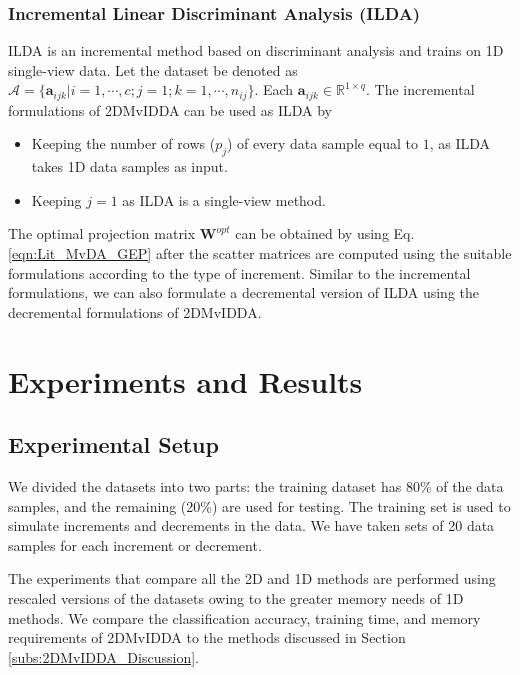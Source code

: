\subsubsection{Incremental Linear Discriminant Analysis (ILDA)}
\label{ssubs:2DMvIDDA_ILDA}
ILDA is an incremental method based on discriminant analysis and trains on 1D single-view data. Let the dataset be denoted as $\mathcal{A} = \{ \textbf{a}_{ijk} | i=1,\cdots,c; j=1; k=1,\cdots,n_{ij} \}$. Each $\textbf{a}_{ijk} \in \mathbb{R}^{1 \times q}$. The incremental formulations of 2DMvIDDA can be used as ILDA by 
\begin{itemize}
	\item Keeping the number of rows ($p_j$) of every data sample equal to $1$, as ILDA takes 1D data samples as input.
	\item Keeping $j = 1$ as ILDA is a single-view method.
\end{itemize}
The optimal projection matrix $\textbf{W}^{opt}$ can be obtained by using Eq. \ref{eqn:Lit_MvDA_GEP} after the scatter matrices are computed using the suitable formulations according to the type of increment. Similar to the incremental formulations, we can also formulate a decremental version of ILDA using the decremental formulations of 2DMvIDDA.












\section{Experiments and Results}
\label{sec:2DMvIDDA_Expt}

\subsection{Experimental Setup}
\label{subs:2DMvIDDA_Expt_Setup}
We divided the datasets into two parts: the training dataset has 80\% of the data samples, and the remaining (20\%) are used for testing. The training set is used to simulate increments and decrements in the data. We have taken sets of 20 data samples for each increment or decrement.

The experiments that compare all the 2D and 1D methods are performed using rescaled versions of the datasets owing to the greater memory needs of 1D methods. We compare the classification accuracy, training time, and memory requirements of 2DMvIDDA to the methods discussed in Section \ref{subs:2DMvIDDA_Discussion}.

